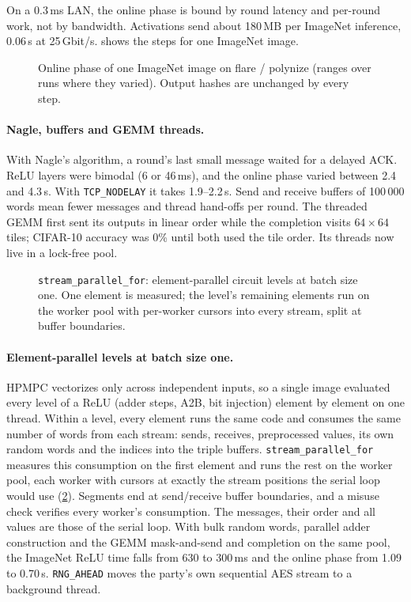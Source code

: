 \documentclass[10pt,a4paper]{article}
\newcommand{\flag}[1]{\nolinkurl{#1}}
\newcommand{\ms}{\,ms\xspace}
\newcommand{\s}{\,s\xspace}
\begin{document}
On a 0.3\ms LAN, the online phase is bound by round latency and per-round work, not by bandwidth.
Activations send about 180\,MB per ImageNet inference, 0.06\s at 25\,Gbit/s. 
shows the steps for one ImageNet image.

\begin{figure}[t]
  \centering
  \caption{Online phase of one ImageNet image on flare / polynize (ranges over runs where they varied).
  Output hashes are unchanged by every step.}
  \label{fig:online}
\end{figure}

\paragraph{Nagle, buffers and GEMM threads.} With Nagle's algorithm, a round's last small message waited for a delayed
ACK. ReLU layers were bimodal (6 or 46\ms), and the online phase varied between 2.4 and 4.3\s. With
\flag{TCP_NODELAY} it takes 1.9--2.2\s. Send and receive buffers of 100\,000 words mean fewer messages
and thread hand-offs per round. The threaded GEMM first sent its outputs in linear order while
the completion visits $64\times64$ tiles; CIFAR-10 accuracy was 0\% until both used the tile order. Its threads now live in a
lock-free pool.

\begin{figure}[t]
  \centering
  \caption{\texttt{stream\_parallel\_for}: element-parallel circuit levels at batch size one. One element
  is measured; the level's remaining elements run on the worker pool with per-worker cursors into every
  stream, split at buffer boundaries.}
  \label{fig:stream}
\end{figure}

\paragraph{Element-parallel levels at batch size one.} HPMPC vectorizes only across independent inputs,
so a single image evaluated every level of a ReLU (adder steps, A2B, bit injection) element by
element on one thread. Within a level, every element runs the same code and consumes the same number of
words from each stream: sends, receives, preprocessed values, its own random words and the indices into
the triple buffers. \texttt{stream\_parallel\_for} measures this consumption on the first element and runs
the rest on the worker pool, each worker with cursors at exactly the stream positions the serial loop
would use (\cref{fig:stream}). Segments end at send/receive buffer boundaries, and a misuse check verifies
every worker's consumption. The messages, their order and all values are those of the serial loop.
With bulk random words, parallel adder construction and the GEMM mask-and-send and completion on the same
pool, the ImageNet ReLU time falls from 630 to 300\ms and the online phase from 1.09 to 0.70\s.
\flag{RNG_AHEAD} moves the party's own sequential AES stream to a background thread.
\end{document}
